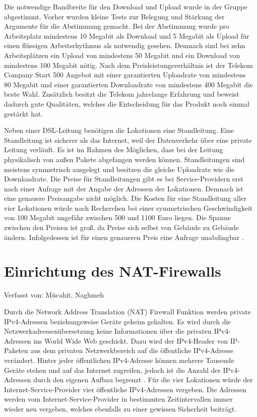 \documentclass[fontsize=12pt,paper=a4,open=any,parskip=half,
  twoside=false,toc=listof,toc=bibliography,fleqn,leqno,
  captions=nooneline,captions=tableabove,british]{scrbook}
\begin{document}
\newpage
Die notwendige Bandbreite für den Download und Upload wurde in der Gruppe abgestimmt. Vorher wurden kleine Tests zur Belegung und Stärkung der Argumente für die Abstimmung gemacht. Bei der Abstimmung wurde pro Arbeitsplatz mindestens 10 Megabit als Download und 5 Megabit als Upload für einen flüssigen Arbeitsrhythmus als notwendig gesehen. Demnach sind bei zehn Arbeitsplätzen ein Upload von mindestens 50 Megabit und ein Download von mindestens 100 Megabit nötig. Nach dem Preisleistungsverhältnis ist der Telekom Company Start 500 \cite{companystart} Angebot mit einer garantierten Uploadrate von mindestens 80 Megabit und einer garantierten Downloadrate von mindestens 400 Megabit die beste Wahl. Zusätzlich besitzt die Telekom jahrelange Erfahrung und beweist dadurch gute Qualitäten, welches die Entscheidung für das Produkt noch einmal gestärkt hat.\par
Neben einer DSL-Leitung benötigen die Lokationen eine Standleitung. Eine Standleitung ist sicherer als das Internet, weil der Datenverkehr über eine private Leitung verläuft. Es ist im Rahmen des Möglichen, dass bei der Leitung physikalisch von außen Pakete abgefangen werden können. Standleitungen sind meistens symmetrisch ausgelegt und besitzen die gleiche Uploadrate wie die Downloadrate. Die Preise für Standleitungen gibt es bei Service-Providern erst nach einer Anfrage mit der Angabe der Adressen der Lokationen. Demnach ist eine genauere Preisangabe nicht möglich. Die Kosten für eine Standleitung aller vier Lokationen würde nach Recherchen bei einer symmetrischen Geschwindigkeit von 100 Megabit ungefähr zwischen 500 und 1100 Euro liegen. Die Spanne zwischen den Preisen ist groß, da Preise sich selbst von Gebäude zu Gebäude ändern. Infolgedessen ist für einen genaueren Preis eine Anfrage unabdingbar \cite{standleitung}.

\newpage
\section{Einrichtung des NAT-Firewalls}
{\tiny Verfasst von: Mücahit, Naghmeh\par}
Durch die Network Address Translation (NAT) Firewall Funktion werden private IPv4-Adressen beziehungsweise Geräte geheim gehalten. Es wird durch die Netzwerkadressenübersetzung keine Informationen über die privaten IPv4-Adressen ins World Wide Web geschickt. Dazu wird der IPv4-Header von IP-Paketen aus dem privaten Netzwerkbereich auf die öffentliche IPv4-Adresse verändert. Hinter jeder öffentlichen IPv4-Adresse können mehrere Tausende Geräte stehen und auf das Internet zugreifen, jedoch ist die Anzahl der IPv4-Adressen durch den eigenen Aufbau begrenzt \cite{NATdef}. Für die vier Lokationen würde der Internet-Service-Provider vier öffentliche IPv4-Adressen vergeben. Die Adressen werden vom Internet-Service-Provider in bestimmten Zeitintervallen immer wieder neu vergeben, welches ebenfalls zu einer gewissen Sicherheit beiträgt.
\end{document}
